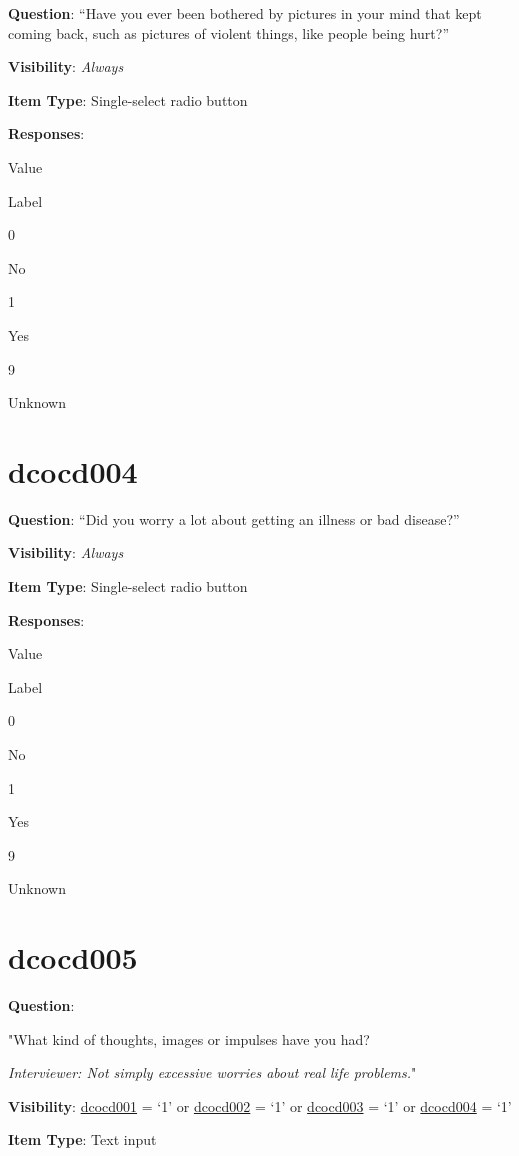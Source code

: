 \documentclass[]{book}
\begin{document}
\textbf{Question}: ``Have you ever been bothered by pictures in your mind that kept coming back, such as pictures of violent things, like people being hurt?''

\textbf{Visibility}: \emph{Always}

\textbf{Item Type}: Single-select radio button

\textbf{Responses}:

Value

Label

0

No

1

Yes

9

Unknown

\hypertarget{dcocd004}{%
\section{dcocd004}\label{dcocd004}}

\textbf{Question}: ``Did you worry a lot about getting an illness or bad disease?''

\textbf{Visibility}: \emph{Always}

\textbf{Item Type}: Single-select radio button

\textbf{Responses}:

Value

Label

0

No

1

Yes

9

Unknown

\hypertarget{dcocd005}{%
\section{dcocd005}\label{dcocd005}}

\textbf{Question}:

"What kind of thoughts, images or impulses have you had?

\emph{Interviewer: Not simply excessive worries about real life problems.}"

\textbf{Visibility}: \protect\hyperlink{dcocd001}{dcocd001} = `1' or \protect\hyperlink{dcocd002}{dcocd002} = `1' or \protect\hyperlink{dcocd003}{dcocd003} = `1' or \protect\hyperlink{dcocd004}{dcocd004} = `1'

\textbf{Item Type}: Text input
\end{document}
